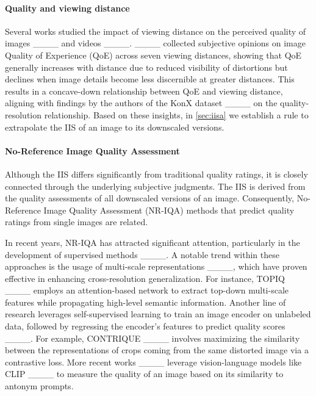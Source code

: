 \paragraph{Quality and viewing distance} Several works studied the impact of viewing distance on the perceived quality of images ____ and videos ____. ____ collected subjective opinions on image Quality of Experience (QoE) across seven viewing distances, showing that QoE generally increases with distance due to reduced visibility of distortions but declines when image details become less discernible at greater distances. This results in a concave-down relationship between QoE and viewing distance, aligning with findings by the authors of the KonX dataset ____ on the quality-resolution relationship. Based on these insights, in \cref{sec:iisa} we establish a rule to extrapolate the IIS of an image to its downscaled versions.

\paragraph{No-Reference Image Quality Assessment}
Although the IIS differs significantly from traditional quality ratings, it is closely connected through the underlying subjective judgments. The IIS is derived from the quality assessments of all downscaled versions of an image. Consequently, No-Reference Image Quality Assessment (NR-IQA) methods that predict quality ratings from single images are related.

In recent years, NR-IQA has attracted significant attention, particularly in the development of supervised methods ____. A notable trend within these approaches is the usage of multi-scale representations ____, which have proven effective in enhancing cross-resolution generalization. For instance, TOPIQ ____ employs an attention-based network to extract top-down multi-scale features while propagating high-level semantic information.
Another line of research leverages self-supervised learning to train an image encoder on unlabeled data, followed by regressing the encoder’s features to predict quality scores ____. For example, CONTRIQUE ____ involves maximizing the similarity between the representations of crops coming from the same distorted image via a contrastive loss.
More recent works ____ leverage vision-language models like CLIP ____ to measure the quality of an image based on its similarity to antonym prompts.


